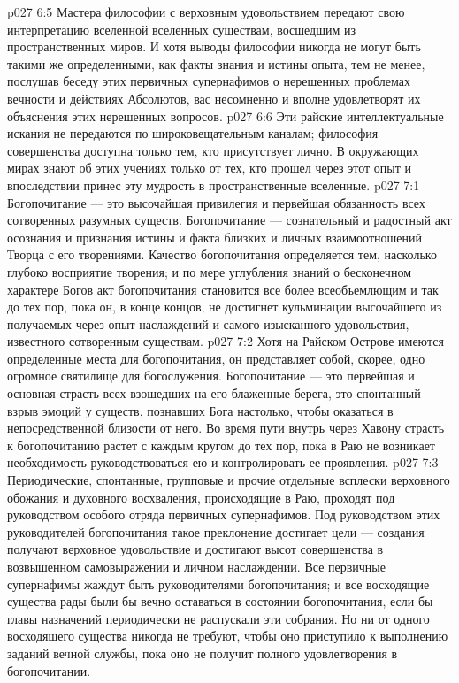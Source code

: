 \vs p027 6:5 Мастера философии с верховным удовольствием передают свою интерпретацию вселенной вселенных существам, восшедшим из пространственных миров. И хотя выводы философии никогда не могут быть такими же определенными, как факты знания и истины опыта, тем не менее, послушав беседу этих первичных супернафимов о нерешенных проблемах вечности и действиях Абсолютов, вас несомненно и вполне удовлетворят их объяснения этих нерешенных вопросов.
\vs p027 6:6 Эти райские интеллектуальные искания не передаются по широковещательным каналам; философия совершенства доступна только тем, кто присутствует лично. В окружающих мирах знают об этих учениях только от тех, кто прошел через этот опыт и впоследствии принес эту мудрость в пространственные вселенные.
\vs p027 7:1 Богопочитание --- это высочайшая привилегия и первейшая обязанность всех сотворенных разумных существ. Богопочитание --- сознательный и радостный акт осознания и признания истины и факта близких и личных взаимоотношений Творца с его творениями. Качество богопочитания определяется тем, насколько глубоко восприятие творения; и по мере углубления знаний о бесконечном характере Богов акт богопочитания становится все более всеобъемлющим и так до тех пор, пока он, в конце концов, не достигнет кульминации высочайшего из получаемых через опыт наслаждений и самого изысканного удовольствия, известного сотворенным существам.
\vs p027 7:2 \pc Хотя на Райском Острове имеются определенные места для богопочитания, он представляет собой, скорее, одно огромное святилище для богослужения. Богопочитание --- это первейшая и основная страсть всех взошедших на его блаженные берега, это спонтанный взрыв эмоций у существ, познавших Бога настолько, чтобы оказаться в непосредственной близости от него. Во время пути внутрь через Хавону страсть к богопочитанию растет с каждым кругом до тех пор, пока в Раю не возникает необходимость руководствоваться ею и контролировать ее проявления.
\vs p027 7:3 Периодические, спонтанные, групповые и прочие отдельные всплески верховного обожания и духовного восхваления, происходящие в Раю, проходят под руководством особого отряда первичных супернафимов. Под руководством этих руководителей богопочитания такое преклонение достигает цели --- создания получают верховное удовольствие и достигают высот совершенства в возвышенном самовыражении и личном наслаждении. Все первичные супернафимы жаждут быть руководителями богопочитания; и все восходящие существа рады были бы вечно оставаться в состоянии богопочитания, если бы главы назначений периодически не распускали эти собрания. Но ни от одного восходящего существа никогда не требуют, чтобы оно приступило к выполнению заданий вечной службы, пока оно не получит полного удовлетворения в богопочитании.
